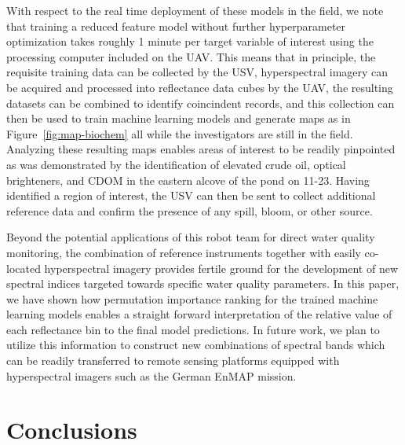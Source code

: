 \documentclass[sensors,article,submit,pdftex,moreauthors]{Definitions/mdpi}
\begin{document}
With respect to the real time deployment of these models in the field, we note that training a reduced feature model without further hyperparameter optimization takes roughly 1 minute per target variable of interest using the processing computer included on the UAV. This means that in principle, the requisite training data can be collected by the USV, hyperspectral imagery can be acquired and processed into reflectance data cubes by the UAV, the resulting datasets can be combined to identify coincindent records, and this collection can then be used to train machine learning models and generate maps as in Figure~\ref{fig:map-biochem} all while the investigators are still in the field. Analyzing these resulting maps enables areas of interest to be readily pinpointed as was demonstrated by the identification of elevated crude oil, optical brighteners, and CDOM in the eastern alcove of the pond on 11-23. Having identified a region of interest, the USV can then be sent to collect additional reference data and confirm the presence of any spill, bloom, or other source.

Beyond the potential applications of this robot team for direct water quality monitoring, the combination of reference instruments together with easily co-located hyperspectral imagery provides fertile ground for the development of new spectral indices targeted towards specific water quality parameters. In this paper, we have shown how permutation importance ranking for the trained machine learning models enables a straight forward interpretation of the relative value of each reflectance bin to the final model predictions. In future work, we plan to utilize this information to construct new combinations of spectral bands which can be readily transferred to remote sensing platforms equipped with hyperspectral imagers such as the German EnMAP mission.




\section{Conclusions}
\end{document}
